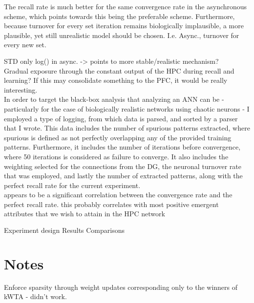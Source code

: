 The recall rate is much better for the same convergence rate in the asynchronous scheme, which points towards this being the preferable scheme. Furthermore, because turnover for every set iteration remains biologically implausible, a more plausible, yet still unrealistic model should be chosen. I.e. Async., turnover for every new set.

STD only log() in async. -> points to more stable/realistic mechanism?
\\

Gradual exposure through the constant output of the HPC during recall and learning? If this may consolidate something to the PFC, it would be really interesting.
\\

In order to target the black-box analysis that analyzing an ANN can be - particularly for the case of biologically realistic networks using chaotic neurons - I employed a type of logging, from which data is parsed, and sorted by a parser that I wrote. This data includes the number of spurious patterns extracted, where spurious is defined as not perfectly overlapping any of the provided training patterns. Furthermore, it includes the number of iterations before convergence, where 50 iterations is considered as failure to converge. It also includes the weighting selected for the connections from the DG, the neuronal turnover rate that was employed, and lastly the number of extracted patterns, along with the perfect recall rate for the current experiment.
\\

appears to be a significant correlation between the convergence rate and the perfect recall rate. this probably correlates with most positive emergent attributes that we wish to attain in the HPC network




Experiment design
Results
Comparisons

\section*{Notes}

Enforce sparsity through weight updates corresponding only to the winners of kWTA - didn't work.

